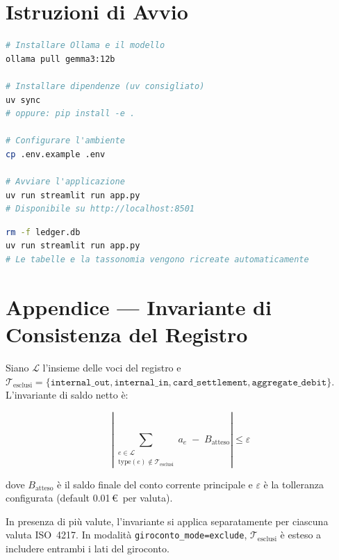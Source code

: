 \documentclass[11pt, a4paper]{article}
\begin{document}
\section{Istruzioni di Avvio}

\begin{lstlisting}[language=bash, caption={Setup}]
# Installare Ollama e il modello
ollama pull gemma3:12b

# Installare dipendenze (uv consigliato)
uv sync
# oppure: pip install -e .

# Configurare l'ambiente
cp .env.example .env

# Avviare l'applicazione
uv run streamlit run app.py
# Disponibile su http://localhost:8501
\end{lstlisting}

\begin{lstlisting}[language=bash, caption={Reset del database (sviluppo)}]
rm -f ledger.db
uv run streamlit run app.py
# Le tabelle e la tassonomia vengono ricreate automaticamente
\end{lstlisting}


\section*{Appendice --- Invariante di Consistenza del Registro}
\label{app:invariant}

Siano $\mathcal{L}$ l'insieme delle voci del registro e
$\mathcal{T}_{\text{esclusi}} =
\{\texttt{internal\_out}, \texttt{internal\_in}, \texttt{card\_settlement},
  \texttt{aggregate\_debit}\}$.
L'invariante di saldo netto è:

\[
  \left|
    \sum_{\substack{e \in \mathcal{L} \\ \text{type}(e) \notin \mathcal{T}_{\text{esclusi}}}}
    a_e \;-\; B_{\text{atteso}}
  \right| \leq \varepsilon
\]

dove $B_{\text{atteso}}$ è il saldo finale del conto corrente principale e $\varepsilon$
è la tolleranza configurata (default 0.01\,\euro\ per valuta).

In presenza di più valute, l'invariante si applica separatamente per ciascuna valuta
ISO~4217. In modalità \texttt{giroconto\_mode=exclude}, $\mathcal{T}_{\text{esclusi}}$
è esteso a includere entrambi i lati del giroconto.
\end{document}
